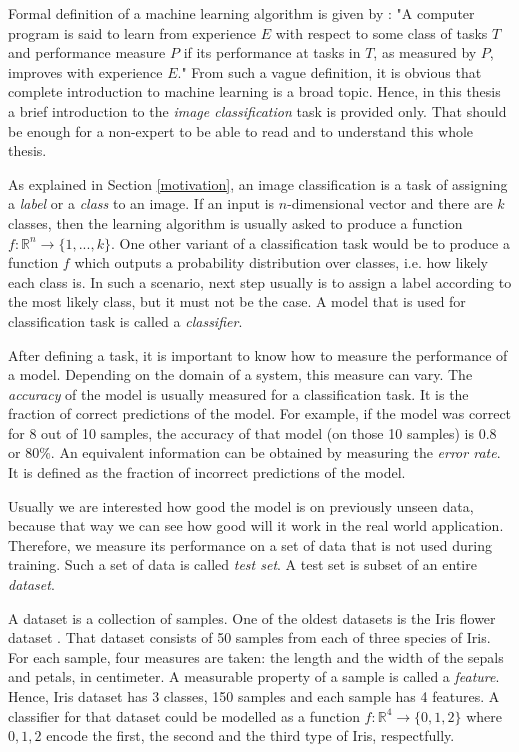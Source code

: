 Formal definition of a machine learning algorithm is given by \cite{Mitchell:1997:ML:541177}: "A computer program is said to learn from experience $E$ with respect to some class of tasks $T$ and performance measure $P$ if its performance at tasks in $T$, as measured by $P$, improves with experience $E$." 
From such a vague definition, it is obvious that complete introduction to machine learning is a broad topic. Hence, in this thesis a brief introduction to the \textit{image classification} task is provided only. That should be enough for a non-expert to be able to read and to understand this whole thesis.

As explained in Section \ref{motivation}, an image classification is a task of assigning a \textit{label} or a \textit{class} to an image. If an input is $n$-dimensional vector and there are $k$ classes, then the learning algorithm is usually asked to produce a function $f: \mathbb{R}^n \rightarrow \{1, ... , k\}$. One other variant of a classification task would be to produce a function $f$ which outputs a probability distribution over classes, i.e. how likely each class is. In such a scenario, next step usually is to assign a label according to the most likely class, but it must not be the case. A model that is used for classification task is called a \textit{classifier}.

After defining a task, it is important to know how to measure the performance of a model. Depending on the domain of a system, this measure can vary. The \textit{accuracy} of the model is usually measured for a classification task. It is the fraction of correct predictions of the model. For example, if the model was correct for 8 out of 10 samples, the accuracy of that model (on those 10 samples) is $0.8$ or $80\%$. An equivalent information can be obtained by measuring the \textit{error rate}. It is defined as the fraction of incorrect predictions of the model. 

Usually we are interested how good the model is on previously unseen data, because that way we can see how good will it work in the real world application. Therefore, we measure its performance on a set of data that is not used during training. Such a set of data is called \textit{test set}. A test set is subset of an entire \textit{dataset}.

A dataset is a collection of samples. One of the oldest datasets is the Iris flower dataset \cite{iris-dataset}. That dataset consists of 50 samples from each of three species of Iris. For each sample, four measures are taken: the length and the width of the sepals and petals, in centimeter. A measurable property of a sample is called a \textit{feature}. Hence, Iris dataset has 3 classes, 150 samples and each sample has 4 features. A classifier for that dataset could be modelled as a function $f: \mathbb{R}^4 \rightarrow \{0, 1, 2\}$ where $0, 1, 2$  encode the first, the second and the third type of Iris, respectfully.

